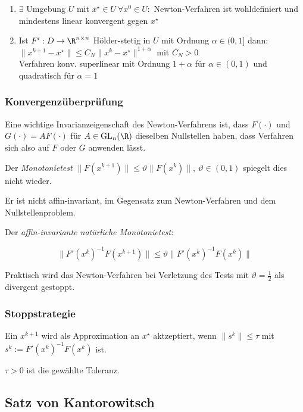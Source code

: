 \begin{enumerate}[label=(\alph*)]
	\item $\exists$ Umgebung $U$ mit $x^\star \in U \ \forall x^0 \in U : $ Newton-Verfahren ist wohldefiniert und mindestens linear konvergent gegen $x^\star$
	\item Ist $F' : D \to \R^{n \times n}$ Hölder-stetig in $U$ mit Ordnung $\alpha \in (0,1]$ dann: \\ $\|x^{k+1}-x^\star\| \leq C_N \|x^k-x^\star\|^{1+\alpha}$ mit $C_N > 0$ \\ Verfahren konv. superlinear mit Ordnung $1+\alpha$ für $\alpha \in (0,1)$ und quadratisch für $\alpha = 1$
\end{enumerate}

\subsubsection*{Konvergenzüberprüfung}

Eine wichtige Invarianzeigenschaft des Newton-Verfahrens ist, dass $F(\cdot)$ und $G(\cdot) = AF(\cdot)$ für $A \in \text{GL}_n(\R)$ dieselben Nullstellen haben, dass Verfahren sich also auf $F$ oder $G$ anwenden lässt.

Der \emph{Monotonietest} $\|F(x^{k+1})\| \leq \vartheta\|F(x^k)\|, \ \vartheta \in (0,1)$ spiegelt dies nicht wieder.

Er ist nicht affin-invariant, im Gegensatz zum Newton-Verfahren und dem Nullstellenproblem.

\vspace*{1mm}

Der \emph{affin-invariante natürliche Monotonietest}:

\vspace{-2mm}
\[ \|F'(x^k)^{-1}F(x^{k+1})\| \leq \vartheta\|F'(x^k)^{-1}F(x^k)\| \]

Praktisch wird das Newton-Verfahren bei Verletzung des Tests mit $\vartheta = \frac{1}{2}$ als divergent gestoppt.

\subsubsection*{Stoppstrategie}

Ein $x^{k+1}$ wird als Approximation an $x^\star$ aktzeptiert, wenn $\|s^k\| \leq \tau$ mit $s^k := F'(x^k)^{-1}F(x^k)$ ist.

$\tau > 0$ ist die gewählte Toleranz.

\subsection*{Satz von Kantorowitsch}

